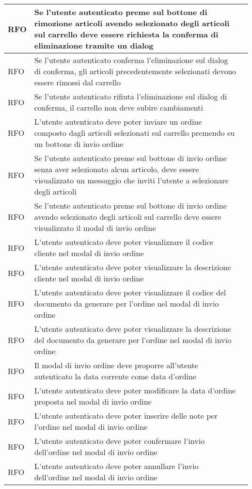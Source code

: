 \begin{center}
\begin{longtable}{ | >{\centering\arraybackslash}m{2.5cm} | >{\centering\arraybackslash}m{8cm} | >{\centering\arraybackslash}m{2.5cm} | }
RFO & Se l'utente autenticato preme sul bottone di rimozione articoli avendo selezionato degli articoli sul carrello deve essere richiesta la conferma di eliminazione tramite un dialog & \\ \hline
RFO & Se l'utente autenticato conferma l'eliminazione sul dialog di conferma, gli articoli precedentemente selezionati devono essere rimossi dal carrello & \\ \hline
RFO & Se l'utente autenticato rifiuta l'eliminazione sul dialog di conferma, il carrello non deve subire cambiamenti & \\ \hline
RFO & L'utente autenticato deve poter inviare un ordine composto dagli articoli selezionati sul carrello premendo su un bottone di invio ordine & \\ \hline
RFO & Se l'utente autenticato preme sul bottone di invio ordine senza aver selezionato alcun articolo, deve essere visualizzato un messaggio che inviti l'utente a selezionare degli articoli & \\ \hline
RFO & Se l'utente autenticato preme sul bottone di invio ordine avendo selezionato degli articoli sul carrello deve essere visualizzato il modal di invio ordine & \\ \hline
RFO & L'utente autenticato deve poter visualizzare il codice cliente nel modal di invio ordine & \\ \hline
RFO & L'utente autenticato deve poter visualizzare la descrizione cliente nel modal di invio ordine & \\ \hline
RFO & L'utente autenticato deve poter visualizzare il codice del documento da generare per l'ordine nel modal di invio ordine & \\ \hline
RFO & L'utente autenticato deve poter visualizzare la descrizione del documento da generare per l'ordine nel modal di invio ordine & \\ \hline
RFO & Il modal di invio ordine deve proporre all'utente autenticato la data corrente come data d'ordine & \\ \hline
RFO & L'utente autenticato deve poter modificare la data d'ordine proposta nel modal di invio ordine & \\ \hline
RFO & L'utente autenticato deve poter inserire delle note per l'ordine nel modal di invio ordine & \\ \hline
RFO & L'utente autenticato deve poter confermare l'invio dell'ordine nel modal di invio ordine & \\ \hline
RFO & L'utente autenticato deve poter annullare l'invio dell'ordine nel modal di invio ordine & \\ \hline

\end{longtable}
\end{center}
